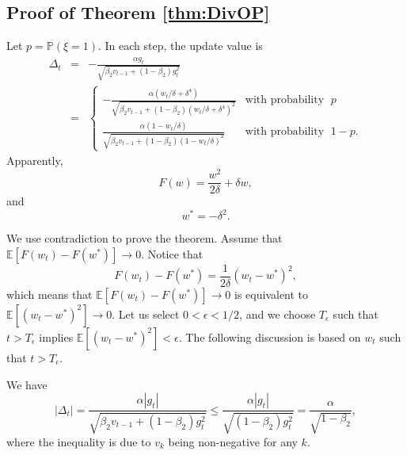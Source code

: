 \documentclass[twoside]{article}
\def\EE{\mathbb{E}}
\def\PP{\mathbb{P}}
\begin{document}
\subsection{Proof of Theorem \ref{thm:DivOP}}

Let $p = \PP(\xi=1)$. In each step, the update value is
\begin{eqnarray}
\Delta_t &=& -\frac{\alpha g_t}{\sqrt{\beta_2v_{t-1} + (1-\beta_2)g_t^2 }}\nonumber\\
&=&\begin{cases}
-\frac{\alpha(w_t/\delta + \delta^4) }{\sqrt{\beta_2 v_{t-1} + (1-\beta_2) (w_t/\delta + \delta^4)^2 }} & \text{with probability }\; p \\
\frac{\alpha(1-w_t/\delta)}{\sqrt{\beta_2 v_{t-1} + (1-\beta_2)(1-w_t/\delta)^2}} & \text{with probability }\; 1-p.
\end{cases}\nonumber
\end{eqnarray}
Apparently, 
\begin{equation*}
F(w) =  \frac{w^2}{2\delta} + \delta w,
\end{equation*}
and 
\begin{equation*}
w^*=-\delta^2.
\end{equation*}

We use contradiction to prove the theorem. Assume that $\EE[F(w_t)-F(w^*)]\to 0$. Notice that
\begin{equation*}
F(w_t) - F(w^*) = \frac{1}{2\delta} (w_t-w^*)^2\nonumber,
\end{equation*}
which means that $\EE[F(w_t)-F(w^*)]\to 0$ is equivalent to  $\EE\left[\left(w_t-w^*\right)^2\right]\to 0$. Let us select $0 < \epsilon < 1/2$, and we choose $T_\epsilon$ such that $t>T_\epsilon$ implies $\EE\left[\left(w_t-w^*\right)^2\right]<\epsilon$. The following discussion is based on $w_t$ such that $t>T_\epsilon$.

We have\begin{equation}
\label{stplth}
|\Delta_t|= \frac{\alpha |g_t|}{\sqrt{\beta_2 v_{t-1} +(1-\beta_2) g_t^2}} \leq\frac{\alpha |g_t|}{\sqrt{(1-\beta_2) g_t^2}} = \frac{\alpha}{\sqrt{1-\beta_2}},
\end{equation}
where the inequality is due to $v_k$ being non-negative for any $k$.
\end{document}
